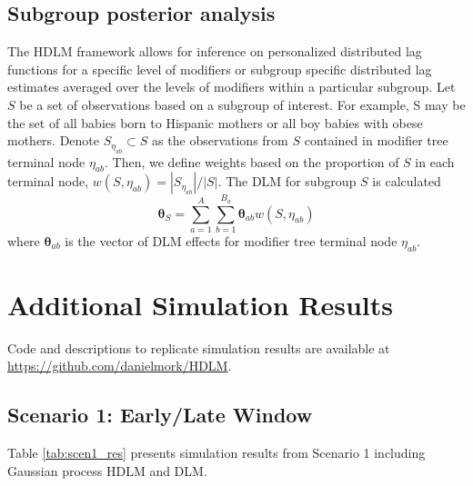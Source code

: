\documentclass[12pt]{article}
\begin{document}
\subsection{Subgroup posterior analysis}
The HDLM framework allows for inference on personalized distributed lag functions for a specific level of modifiers or subgroup specific distributed lag estimates averaged over the levels of modifiers within a particular subgroup. Let $S$ be a set of observations based on a subgroup of interest. For example, S may be the set of all babies born to Hispanic mothers or all boy babies with obese mothers. Denote $S_{\eta_{ab}}\subset S$ as the observations from $S$ contained in modifier tree terminal node $\eta_{ab}$. Then, we define weights based on the proportion of $S$ in each terminal node, $w(S,\eta_{ab})=|S_{\eta_{ab}}|\big/|S|$. The DLM for subgroup $S$ is calculated
\begin{equation}
    \boldsymbol\theta_S=\sum_{a=1}^A\sum_{b=1}^{B_a}\boldsymbol\theta_{ab}w(S,\eta_{ab})
\end{equation}
where $\boldsymbol\theta_{ab}$ is the vector of DLM effects for modifier tree terminal node $\eta_{ab}$.


\section{Additional Simulation Results} 
Code and descriptions to replicate simulation results are available at \url{https://github.com/danielmork/HDLM}.
\subsection{Scenario 1: Early/Late Window}
Table \ref{tab:scen1_res} presents simulation results from Scenario 1 including Gaussian process HDLM and DLM.
\end{document}
